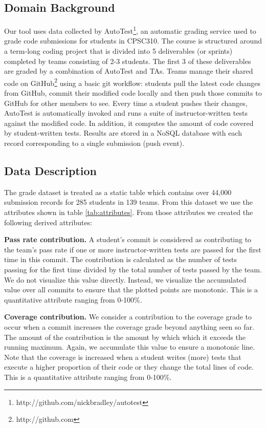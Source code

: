 \documentclass[../manifest.tex]{subfiles}
\begin{document}
\subsection{Domain Background}
Our tool uses data collected by AutoTest\footnote{http://github.com/nickbradley/autotest},
an automatic grading service used to grade code submissions for students in
CPSC310. The course is structured around a term-long coding project that is
divided into 5 deliverables (or sprints) completed by teams consisting of 2-3 students.
The first 3 of these deliverables are graded by a combination of AutoTest and TAs.
Teams manage their shared code on GitHub\footnote{http://github.com}
using a basic git workflow: students pull the latest code changes from GitHub,
commit their modified code locally and then push those commits to GitHub for
other members to see. Every time a student pushes their changes, AutoTest is
automatically invoked and runs a suite of instructor-written tests against the modified
code. In addition, it computes the amount of code covered by student-written tests. Results are stored in a NoSQL database with each record corresponding to a
single submission (push event).


\subsection{Data Description} \label{ssec:data-description}
The grade dataset is treated as a static table which contains over 44,000 submission records for 285 students in 139 teams. From this dataset we use the attributes shown in table \ref{tab:attributes}. From those attributes we created the following derived attributes:

\textbf{Pass rate contribution.} A student's commit is considered as contributing to the team's pass rate if one or more instructor-written tests are passed for the first time in this commit. The contribution is calculated as the number of tests passing for the first time divided by the total number of tests passed by the team. We do not visualize this value directly. Instead, we visualize the accumulated value over all commits to ensure that the plotted points are monotonic. This is a quantitative attribute ranging from 0-100\%.

\textbf{Coverage contribution.} We consider a contribution to the coverage grade to occur when a commit increases the coverage grade beyond anything seen so far. The amount of the  contribution is the amount by which which it exceeds the running maximum. Again, we accumulate this value to ensure a monotonic line. Note that the coverage is increased when a student writes (more) tests that execute a higher proportion of their code or they change the total lines of code. This is a quantitative attribute ranging from 0-100\%.
\end{document}
